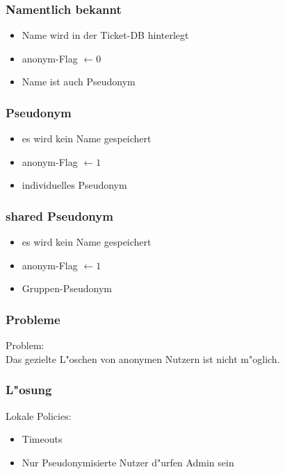 
\begin{frame}
	\frametitle{Namentlich bekannt}
	\begin{itemize}
		\item<2-> Name wird in der Ticket-DB hinterlegt
		\item<3-> anonym-Flag $\leftarrow 0$ 
		\item<4-> Name ist auch Pseudonym
	\end{itemize}
\end{frame}


\begin{frame}
	\frametitle{Pseudonym}
	\begin{itemize}
		\item<2-> es wird kein Name gespeichert
		\item<3-> anonym-Flag $\leftarrow 1$  
		\item<4-> individuelles Pseudonym
	\end{itemize}
\end{frame}


\begin{frame}
	\frametitle{shared Pseudonym}
	\begin{itemize}
		\item<2-> es wird kein Name gespeichert
		\item<3-> anonym-Flag $\leftarrow 1$  
		\item<4-> Gruppen-Pseudonym  
	\end{itemize}
\end{frame}

\begin{frame}
	\frametitle{Probleme}
	Problem:\\
	Das gezielte L"oschen von anonymen Nutzern ist nicht
	m"oglich.
\end{frame}

\begin{frame}
	\frametitle{L"osung}
	Lokale Policies:
	\begin{itemize}
		\item<2-> Timeouts
		\item<3-> Nur Pseudonymisierte Nutzer d"urfen Admin sein
	\end{itemize}
\end{frame}
